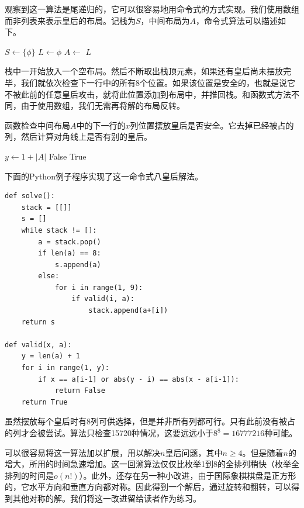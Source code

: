 \documentclass[b5paper]{ctexart}
\begin{document}
观察到这一算法是尾递归的，它可以很容易地用命令式的方式实现。我们使用数组而非列表来表示皇后的布局。记栈为$S$，中间布局为$A$，命令式算法可以描述如下。

\begin{algorithmic}[1]
  \State $S \gets \{\phi\}$
  \State $L \gets \phi$ 
    \State $A \gets$  
      \State {}
    \Else
          \State {}
        \EndIf
      \EndFor
    \EndIf
  \EndWhile
  \State \Return $L$
\EndFunction
\end{algorithmic}

栈中一开始放入一个空布局。然后不断取出栈顶元素，如果还有皇后尚未摆放完毕，我们就依次检查下一行中的所有8个位置。如果该位置是安全的，也就是说它不被此前的任意皇后攻击，就将此位置添加到布局中，并推回栈。和函数式方法不同，由于使用数组，我们无需再将解的布局反转。

函数检查中间布局$A$中的下一行的$x$列位置摆放皇后是否安全。它去掉已经被占的列，然后计算对角线上是否有别的皇后。

\begin{algorithmic}[1]
  \State $y \gets 1 + |A|$
      \State \Return False
    \EndIf
  \EndFor
  \State \Return True
\EndFunction
\end{algorithmic}

下面的Python例子程序实现了这一命令式八皇后解法。

\lstset{language=Python}
\begin{lstlisting}
def solve():
    stack = [[]]
    s = []
    while stack != []:
        a = stack.pop()
        if len(a) == 8:
            s.append(a)
        else:
            for i in range(1, 9):
                if valid(i, a):
                    stack.append(a+[i])
    return s

def valid(x, a):
    y = len(a) + 1
    for i in range(1, y):
        if x == a[i-1] or abs(y - i) == abs(x - a[i-1]):
            return False
    return True
\end{lstlisting}

虽然摆放每个皇后时有8列可供选择，但是并非所有列都可行。只有此前没有被占的列才会被尝试。算法只检查15720种情况，这要远远小于$8^8 = 16777216$种可能\cite{wiki-8-queens}。

可以很容易将这一算法加以扩展，用以解决$n$皇后问题，其中$n \geq 4$。但是随着$n$的增大，所用的时间急速增加。这一回溯算法仅仅比枚举1到8的全排列稍快（枚举全排列的时间是$o(n!)$）。此外，还存在另一种小改进，由于国际象棋棋盘是正方形的，它水平方向和垂直方向都对称。因此得到一个解后，通过旋转和翻转，可以得到其他对称的解。我们将这一改进留给读者作为练习。
\end{document}
